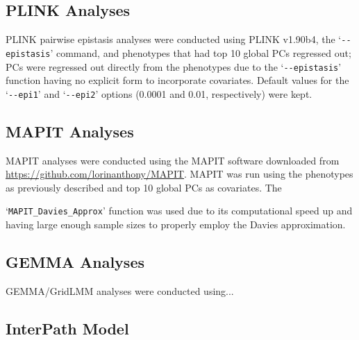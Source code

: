 \documentclass[12pt, a4paper]{article}
\begin{document}
\subsection{PLINK Analyses}

PLINK pairwise epistasis analyses were conducted using PLINK v1.90b4, the `\texttt{-{}-epistasis}' command, and phenotypes that had top 10 global PCs regressed out; PCs were regressed out directly from the phenotypes due to the `\texttt{-{}-epistasis}' function having no explicit form to incorporate covariates. Default values for the `\texttt{-{}-epi1}' and `\texttt{-{}-epi2}' options (0.0001 and 0.01, respectively) were kept. 

\subsection{MAPIT Analyses}

MAPIT analyses were conducted using the MAPIT software downloaded from \url{https://github.com/lorinanthony/MAPIT}. MAPIT was run using the phenotypes as previously described and top 10 global PCs as covariates. The 

\noindent `\texttt{MAPIT\_Davies\_Approx}' function was used due to its computational speed up and having large enough sample sizes to properly employ the Davies approximation. 

\subsection{GEMMA Analyses}

GEMMA/GridLMM analyses were conducted using...

\subsection{InterPath Model}
\end{document}
